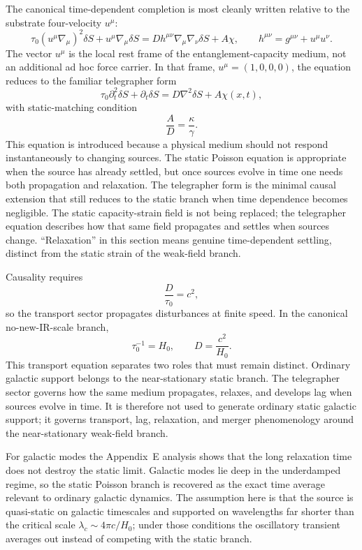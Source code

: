 \documentclass[11pt]{article}
\begin{document}
The canonical time-dependent completion is most cleanly written relative to the substrate four-velocity $u^\mu$:
\[
\tau_0(u^\mu\nabla_\mu)^2\delta S
+u^\mu\nabla_\mu\delta S
=
D h^{\mu\nu}\nabla_\mu\nabla_\nu\delta S
+A\chi,
\qquad
h^{\mu\nu}=g^{\mu\nu}+u^\mu u^\nu .
\]
The vector $u^\mu$ is the local rest frame of the entanglement-capacity medium, not an additional ad hoc force carrier. In that frame, $u^\mu=(1,0,0,0)$, the equation reduces to the familiar telegrapher form
\[
\tau_0\partial_t^2\delta S+\partial_t\delta S
=
D\nabla^2\delta S+A\chi(x,t),
\]
with static-matching condition
\[
\frac{A}{D}=\frac{\kappa}{\gamma}.
\]
This equation is introduced because a physical medium should not respond instantaneously to changing sources. The static Poisson equation is appropriate when the source has already settled, but once sources evolve in time one needs both propagation and relaxation. The telegrapher form is the minimal causal extension that still reduces to the static branch when time dependence becomes negligible. The static capacity-strain field is not being replaced; the telegrapher equation describes how that same field propagates and settles when sources change. ``Relaxation'' in this section means genuine time-dependent settling, distinct from the static strain of the weak-field branch.

Causality requires
\[
\frac{D}{\tau_0}=c^2,
\]
so the transport sector propagates disturbances at finite speed. In the canonical no-new-IR-scale branch,
\[
\tau_0^{-1}=H_0,
\qquad
D=\frac{c^2}{H_0}.
\]
This transport equation separates two roles that must remain distinct. Ordinary galactic support belongs to the near-stationary static branch. The telegrapher sector governs how the same medium propagates, relaxes, and develops lag when sources evolve in time. It is therefore not used to generate ordinary static galactic support; it governs transport, lag, relaxation, and merger phenomenology around the near-stationary weak-field branch.

For galactic modes the Appendix~E analysis shows that the long relaxation time does not destroy the static limit. Galactic modes lie deep in the underdamped regime, so the static Poisson branch is recovered as the exact time average relevant to ordinary galactic dynamics. The assumption here is that the source is quasi-static on galactic timescales and supported on wavelengths far shorter than the critical scale $\lambda_c\sim 4\pi c/H_0$; under those conditions the oscillatory transient averages out instead of competing with the static branch.
\end{document}
